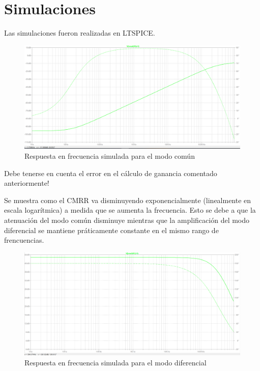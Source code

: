 \documentclass[../../tc_tp3_main.tex]{subfiles}
\begin{document}
\section{Simulaciones}
Las simulaciones fueron realizadas en LTSPICE.
	\begin{figure}[h!]	
		\centering
		\includegraphics[scale=0.3]{imagenes/bode_comun_simulado.png}
		\caption{Respuesta en frecuencia simulada para el modo común}
		\label{fig:ej5_bode_diferencial_simulado}
	\end{figure}

Debe tenerse en cuenta el error en el cálculo de ganancia comentado anteriormente!\par
Se muestra como el CMRR va disminuyendo exponencialmente (linealmente en escala logarítmica) a medida que se aumenta la frecuencia. Esto se debe a que la atenuación del modo común disminuye mientras que la amplificación del modo diferencial se mantiene práticamente constante en el mismo rango de frencuencias.\par

	\begin{figure}[h!]	
		\centering
		\includegraphics[scale=0.3]{imagenes/bode_diferencial_simulado.png}
		\caption{Respuesta en frecuencia simulada para el modo diferencial}
		\label{fig:ej5_bode_diferencial_simulado}
	\end{figure}
	
\end{document}
